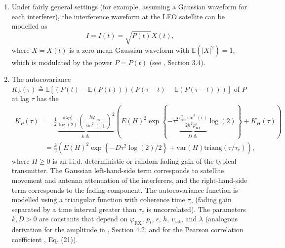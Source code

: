 \documentclass{article}
\begin{document}
                 \begin{enumerate}
                 \item[5.]{Under fairly general settings (for example, assuming a Gaussian waveform for each interferer), the interference waveform at the LEO satellite can be modelled as
                   $$I=I(t)=\sqrt{P(t)}X(t), $$
                   where $X=X(t)$ is a zero-mean Gaussian waveform with $\mathbb{E}(|X|^2)=1$, which is modulated by the power $P=P(t)$ (see , Section 3.4).}
                 \item[6.]{The autocovariance
                   $K_P(\tau) \triangleq \mathbb{E}\left[(P(t)-\mathbb{E}(P(t)))(P(\tau-t)-\mathbb{E}(P(\tau-t)))\right]$
                   of $P$ at lag $\tau$ has the 
                   \begin{align}
                     \label{eq:K_P}
                     K_{P}(\tau) &= \frac{1}{2} \underbrace{\frac{\pi \lambda p_t^2}{\log(2)}  \left(\frac{h \varphi_{\text{RX}}}{\sin^2(\epsilon)}\right)^2}_{ k\triangleq} \left( E(H)^2\exp\left\{-\tau^2\underbrace{\frac{v_{\text{sat}}^2\sin^4(\epsilon)}{2 h^2 \varphi_{\text{RX}}^2}}_{D\triangleq } \log(2)\right\} + K_H(\tau) \right)  \tag{1}\\
                     &=\frac{k}{2} \left(E(H)^2\exp\left\{-D\tau^2 \log(2)/2\right\} +   \text{var}(H) \text{triang}(\tau/\tau_c) \right), \nonumber
                   \end{align}
                   where $H \geq 0$ is an i.i.d. deterministic or random fading gain of the typical transmitter. The Gaussian left-hand-side term corresponds to satellite movement and antenna attenuation of the interferers, and the right-hand-side term corresponds to the fading component. The autocovariance function is modelled using a triangular function with coherence time $\tau_c$ (fading gain separated by a time interval greater than $\tau_c$ is uncorrelated). The parameters $k,D>0$ are constants that depend on $\varphi_{\text{RX}}$, $p_t$, $\epsilon$,  $h$, $v_{\text{sat}}$, and $\lambda$ (analogous derivation for the amplitude in , Section 4.2, and for the Pearson correlation coefficient , Eq. (21)).  
                   
                 }
                   

\end{enumerate}
\end{document}
